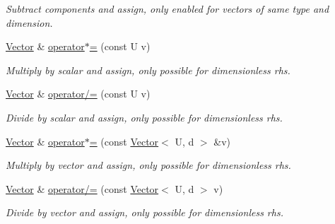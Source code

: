 \begin{DoxyCompactItemize}
\begin{DoxyCompactList}\small\item\em Subtract components and assign, only enabled for vectors of same type and dimension. \end{DoxyCompactList}\item 
\hypertarget{classVector_a8e0a687654972f12cbbc23ef0c5eb7b0}{}\label{classVector_a8e0a687654972f12cbbc23ef0c5eb7b0} 
\hyperlink{classVector}{Vector} \& \hyperlink{classVector_a8e0a687654972f12cbbc23ef0c5eb7b0}{operator$\ast$=} (const U v)
\begin{DoxyCompactList}\small\item\em Multiply by scalar and assign, only possible for dimensionless rhs. \end{DoxyCompactList}\item 
\hypertarget{classVector_a4ce4c2e10575a4d09561fe550a16f4e0}{}\label{classVector_a4ce4c2e10575a4d09561fe550a16f4e0} 
\hyperlink{classVector}{Vector} \& \hyperlink{classVector_a4ce4c2e10575a4d09561fe550a16f4e0}{operator/=} (const U v)
\begin{DoxyCompactList}\small\item\em Divide by scalar and assign, only possible for dimensionless rhs. \end{DoxyCompactList}\item 
\hypertarget{classVector_afca79e52af14d4886d66b68f2db70fa3}{}\label{classVector_afca79e52af14d4886d66b68f2db70fa3} 
\hyperlink{classVector}{Vector} \& \hyperlink{classVector_afca79e52af14d4886d66b68f2db70fa3}{operator$\ast$=} (const \hyperlink{classVector}{Vector}$<$ U, d $>$ \&v)
\begin{DoxyCompactList}\small\item\em Multiply by vector and assign, only possible for dimensionless rhs. \end{DoxyCompactList}\item 
\hypertarget{classVector_ad93f66c4f6cd97e6f48fedc388fedead}{}\label{classVector_ad93f66c4f6cd97e6f48fedc388fedead} 
\hyperlink{classVector}{Vector} \& \hyperlink{classVector_ad93f66c4f6cd97e6f48fedc388fedead}{operator/=} (const \hyperlink{classVector}{Vector}$<$ U, d $>$ v)
\begin{DoxyCompactList}\small\item\em Divide by vector and assign, only possible for dimensionless rhs. \end{DoxyCompactList}\item 
\hypertarget{classVector_a2f7c7d1b093fc195c0ca3ae40bd87cfc}{}\label{classVector_a2f7c7d1b093fc195c0ca3ae40bd87cfc} 

\end{DoxyCompactItemize}
